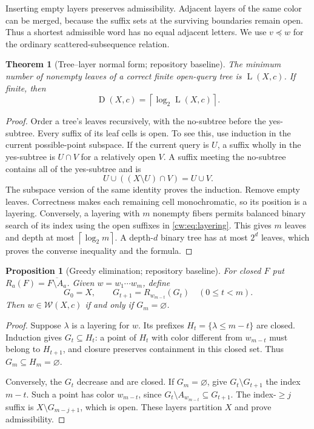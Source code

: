 \documentclass[11pt,letterpaper]{article}
\numberwithin{equation}{section}
\newtheorem{theorem}{Theorem}[section]
\newtheorem{proposition}[proposition]{Proposition}
\theoremstyle{definition}
\theoremstyle{remark}
\theoremstyle{definition}
\newcommand{\ceil}[1]{\left\lceil#1\right\rceil}
\newcommand{\W}{\mathcal W}
\newcommand{\depth}{\operatorname{D}}
\newcommand{\layers}{\operatorname{L}}
\newcommand{\cwcl}[1]{\overline{#1}}
\begin{document}
Inserting empty layers preserves admissibility. Adjacent layers of the same
color can be merged, because the suffix sets at the surviving boundaries
remain open. Thus a shortest admissible word has no equal adjacent letters.
We use $v\preceq w$ for the ordinary scattered-subsequence relation.

\begin{theorem}[Tree--layer normal form; repository baseline]
\label{cw:thm:normal}
The minimum number of nonempty leaves of a correct finite open-query tree is
$\layers(X,c)$. If finite, then
\begin{equation}\label{cw:eq:depth}
 \depth(X,c)=\ceil{\log_2 \layers(X,c)}.
\end{equation}
\end{theorem}
\begin{proof}
Order a tree's leaves recursively, with the no-subtree before the yes-subtree.
Every suffix of its leaf cells is open. To see this, use induction in the
current possible-point subspace. If the current query is $U$, a suffix wholly
in the yes-subtree is $U\cap V$ for a relatively open $V$. A suffix meeting
the no-subtree contains all of the yes-subtree and is
\[
 U\cup((X\setminus U)\cap V)=U\cup V.
\]
The subspace version of the same identity proves the induction. Remove empty
leaves. Correctness makes each remaining cell monochromatic, so its position
is a layering. Conversely, a layering with $m$ nonempty fibers permits balanced
binary search of its index using the open suffixes in \eqref{cw:eq:layering}.
This gives $m$ leaves and depth at most $\ceil{\log_2m}$.
A depth-$d$ binary tree has at most $2^d$ leaves, which proves the converse
inequality and the formula.
\end{proof}

\begin{proposition}[Greedy elimination; repository baseline]
\label{cw:prop:elimination}
For closed $F$ put $R_a(F)=\cwcl{F\setminus A_a}$. Given
$w=w_1\cdots w_m$, define
\begin{equation}\label{cw:eq:elimination}
 G_0=X,\qquad G_{t+1}=R_{w_{m-t}}(G_t)\quad(0\le t<m).
\end{equation}
Then $w\in\W(X,c)$ if and only if $G_m=\varnothing$.
\end{proposition}
\begin{proof}
Suppose $\lambda$ is a layering for $w$. Its prefixes
$H_t=\{\lambda\le m-t\}$ are closed. Induction gives $G_t\subseteq H_t$:
a point of $H_t$ with color different from $w_{m-t}$ must belong to
$H_{t+1}$, and closure preserves containment in this closed set.
Thus $G_m\subseteq H_m=\varnothing$.

Conversely, the $G_t$ decrease and are closed. If $G_m=\varnothing$, give
$G_t\setminus G_{t+1}$ the index $m-t$. Such a point has color $w_{m-t}$,
since $G_t\setminus A_{w_{m-t}}\subseteq G_{t+1}$. The index-$\ge j$ suffix
is $X\setminus G_{m-j+1}$, which is open. These layers partition $X$ and
prove admissibility.
\end{proof}
\end{document}
